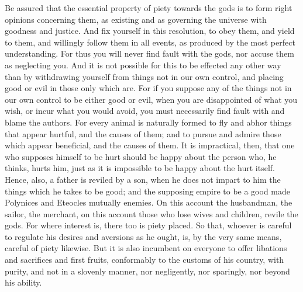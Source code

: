 Be assured  that the essential  property of piety towards  the gods is  to form
right opinions concerning them, as existing  and as governing the universe with
goodness and  justice. And fix yourself  in this resolution, to  obey them, and
yield to them, and willingly follow them in all events, as produced by the most
perfect understanding.  For thus you will  never find fault with  the gods, nor
accuse them as neglecting  you. And it is not possible for  this to be effected
any other way than by withdrawing yourself  from things not in our own control,
and placing good or evil in those only which are. For if you suppose any of the
things  not in  our  own  control to  be  either good  or  evil,  when you  are
disappointed  of  what you  wish,  or  incur what  you  would  avoid, you  must
necessarily  find  fault with  and  blame  the  authors.  For every  animal  is
naturally formed to fly and abhor things that appear hurtful, and the causes of
them; and to pursue and admire those which appear beneficial, and the causes of
them. It is impractical, then, that one  who supposes himself to be hurt should
be happy about the  person who, he thinks, hurts him, just  as it is impossible
to be happy about  the hurt itself. Hence, also, a father is  reviled by a son,
when he does  not impart to him the  things which he takes to be  good; and the
supposing empire to be a good  made Polynices and Eteocles mutually enemies. On
this account  the husbandman, the sailor,  the merchant, on this  account those
who lose wives and children, revile the  gods. For where interest is, there too
is  piety placed.  So that,  whoever  is careful  to regulate  his desires  and
aversions as he ought,  is, by the very same means,  careful of piety likewise.
But it  is also  incumbent on  everyone to offer  libations and  sacrifices and
first fruits, conformably  to the customs of his country,  with purity, and not
in a slovenly manner, nor negligently, nor sparingly, nor beyond his ability.
